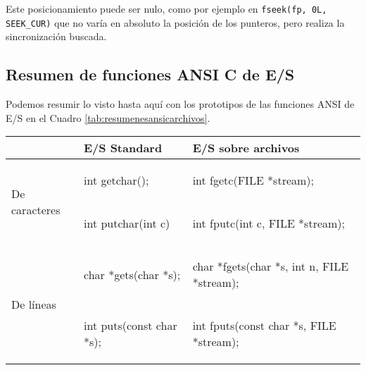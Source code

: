 Este posicionamiento puede ser nulo, como por ejemplo en \lstinline{fseek(fp, 0L, SEEK_CUR)}
que no varía en absoluto la posición de los punteros, pero realiza la
sincronización buscada.

\subsection{Resumen de funciones ANSI C de E/S}
Podemos resumir lo visto hasta aquí con los prototipos de las funciones ANSI de
E/S en el Cuadro \ref{tab:resumenesansicarchivos}.

\begin{table}[hbtp]
\centering
\begin{tabular}{l|l|l}
	\hline
			& E/S Standard			& E/S sobre archivos \\
    \hline
    \multirow{2}{*}{De caracteres}  & 
\begin{codecell}
int getchar();	
\end{codecell}
& 
\begin{codecell}
int fgetc(FILE *stream); 
\end{codecell}
\\
    								&
\begin{codecell}
int putchar(int c) 
\end{codecell}
& 
\begin{codecell}
int fputc(int c, FILE *stream); 
\end{codecell}
\\
    \hline
    \multirow{2}{*}{De líneas}  & 
\begin{codecell}
char *gets(char *s);
\end{codecell}
	& 
\begin{codecell}
char *fgets(char *s, 
int n, FILE *stream);
\end{codecell}
\\
    								&
\begin{codecell}
int puts(const char *s);
\end{codecell}
  & 
\begin{codecell}
int fputs(const char *s, 
FILE *stream);
\end{codecell}
 \\
    

\end{tabular}
\end{table}
